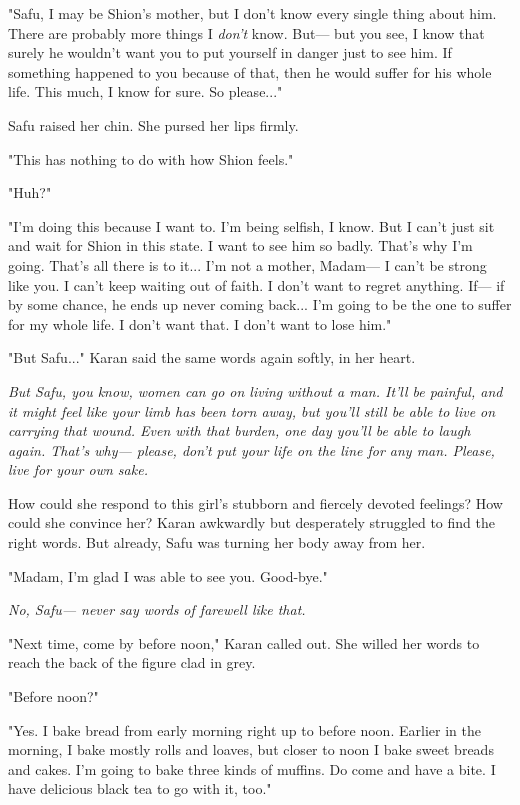 "Safu, I may be Shion's mother, but I don't know every single thing
about him. There are probably more things I \emph{don't} know. But--- but you
see, I know that surely he wouldn't want you to put yourself in danger
just to see him. If something happened to you because of that, then he
would suffer for his whole life. This much, I know for sure. So
please..."

Safu raised her chin. She pursed her lips firmly.

"This has nothing to do with how Shion feels."

"Huh?"

"I'm doing this because I want to. I'm being selfish, I know. But I
can't just sit and wait for Shion in this state. I want to see him so
badly. That's why I'm going. That's all there is to it... I'm not a
mother, Madam--- I can't be strong like you. I can't keep waiting out of
faith. I don't want to regret anything. If--- if by some chance, he ends
up never coming back... I'm going to be the one to suffer for my whole
life. I don't want that. I don't want to lose him."

"But Safu..." Karan said the same words again softly, in her heart.

\emph{But Safu, you know, women can go on living without a man. It'll be
painful, and it might feel like your limb has been torn away, but you'll
still be able to live on carrying that wound. Even with that burden, one
day you'll be able to laugh again. That's why--- please, don't put your
life on the line for any man. Please, live for your own sake.}

How could she respond to this girl's stubborn and fiercely devoted
feelings? How could she convince her? Karan awkwardly but desperately
struggled to find the right words. But already, Safu was turning her
body away from her.

"Madam, I'm glad I was able to see you. Good-bye."

\emph{No, Safu--- never say words of farewell like that.}

"Next time, come by before noon," Karan called out. She willed her words
to reach the back of the figure clad in grey.

"Before noon?"

"Yes. I bake bread from early morning right up to before noon. Earlier
in the morning, I bake mostly rolls and loaves, but closer to noon I
bake sweet breads and cakes. I'm going to bake three kinds of muffins.
Do come and have a bite. I have delicious black tea to go with it, too."

